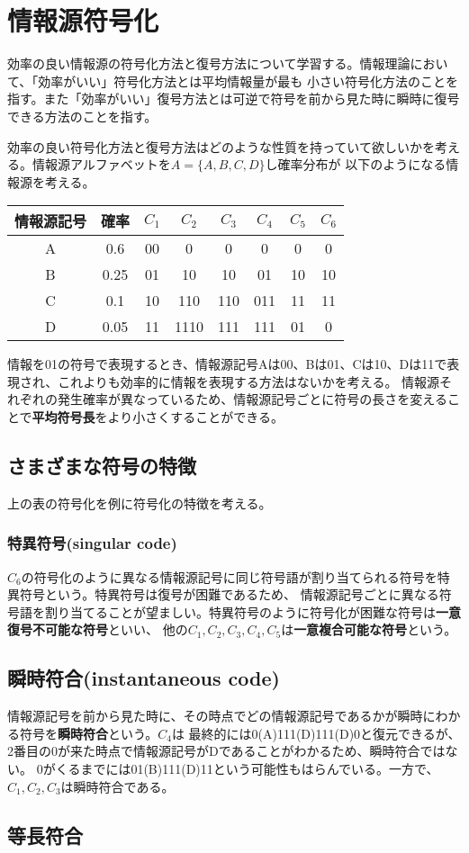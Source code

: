 \documentclass{jlreq}
\begin{document}
\section{情報源符号化}
効率の良い情報源の符号化方法と復号方法について学習する。情報理論において、「効率がいい」符号化方法とは平均情報量が最も
小さい符号化方法のことを指す。また「効率がいい」復号方法とは可逆で符号を前から見た時に瞬時に復号できる方法のことを指す。

効率の良い符号化方法と復号方法はどのような性質を持っていて欲しいかを考える。情報源アルファベットを$A = \{A, B, C, D\}$し確率分布が
以下のようになる情報源を考える。

\vspace{0.5cm}

\begin{table}[h]
  \centering
  \begin{tabular}{|c|c|c|c|c|c|c|c|}
    \hline
    情報源記号 & 確率 & $C_1$ & $C_2$ & $C_3$ & $C_4$ & $C_5$  & $C_6$ \\
    \hline
    A & 0.6 & 00 & 0 & 0 & 0 & 0 & 0\\
    B & 0.25 & 01 & 10 & 10 & 01 & 10 & 10 \\
    C & 0.1 & 10 & 110 & 110 & 011 & 11 & 11 \\
    D & 0.05 & 11 & 1110 & 111 & 111 & 01 & 0 \\
    \hline
  \end{tabular}
\end{table}

\vspace{0.5cm}

情報を01の符号で表現するとき、情報源記号Aは00、Bは01、Cは10、Dは11で表現され、これよりも効率的に情報を表現する方法はないかを考える。
情報源それぞれの発生確率が異なっているため、情報源記号ごとに符号の長さを変えることで\textbf{平均符号長}をより小さくすることができる。

\subsection{さまざまな符号の特徴}
上の表の符号化を例に符号化の特徴を考える。
\subsubsection{特異符号(singular code)}
$C_6$の符号化のように異なる情報源記号に同じ符号語が割り当てられる符号を特異符号という。特異符号は復号が困難であるため、
情報源記号ごとに異なる符号語を割り当てることが望ましい。特異符号のように符号化が困難な符号は\textbf{一意復号不可能な符号}といい、
他の$C_1, C_2, C_3, C_4, C_5$は\textbf{一意複合可能な符号}という。

\subsection{瞬時符合(instantaneous code)}
情報源記号を前から見た時に、その時点でどの情報源記号であるかが瞬時にわかる符号を\textbf{瞬時符合}という。$C_{4}$は
最終的には0(A)111(D)111(D)0と復元できるが、2番目の0が来た時点で情報源記号がDであることがわかるため、瞬時符合ではない。
0がくるまでには01(B)111(D)11という可能性もはらんでいる。一方で、$C_1, C_2, C_3$は瞬時符合である。

\subsection{等長符合}
\end{document}
